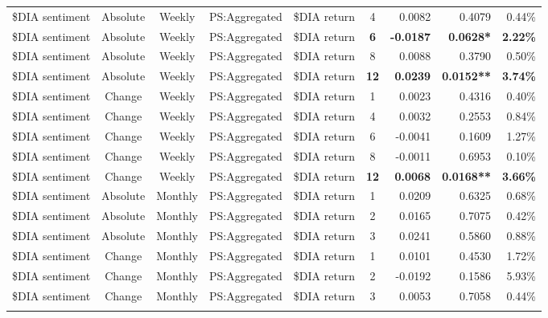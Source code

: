 \begin{longtable}{ccccccrrrrr}
    \$DIA sentiment & Absolute & Weekly & PS:Aggregated & \$DIA return & 4     & 0.0082 & \multicolumn{2}{r}{0.4079} & \multicolumn{2}{r}{0.44\%} \\
    \$DIA sentiment & Absolute & Weekly & PS:Aggregated & \$DIA return & \textbf{6} & \textbf{-0.0187} & \multicolumn{2}{r}{\textbf{0.0628*}} & \multicolumn{2}{r}{\textbf{2.22\%}} \\
    \$DIA sentiment & Absolute & Weekly & PS:Aggregated & \$DIA return & 8     & 0.0088 & \multicolumn{2}{r}{0.3790} & \multicolumn{2}{r}{0.50\%} \\
    \$DIA sentiment & Absolute & Weekly & PS:Aggregated & \$DIA return & \textbf{12} & \textbf{0.0239} & \multicolumn{2}{r}{\textbf{0.0152**}} & \multicolumn{2}{r}{\textbf{3.74\%}} \\
    \$DIA sentiment & Change & Weekly & PS:Aggregated & \$DIA return & 1     & 0.0023 & \multicolumn{2}{r}{0.4316} & \multicolumn{2}{r}{0.40\%} \\
    \$DIA sentiment & Change & Weekly & PS:Aggregated & \$DIA return & 4     & 0.0032 & \multicolumn{2}{r}{0.2553} & \multicolumn{2}{r}{0.84\%} \\
    \$DIA sentiment & Change & Weekly & PS:Aggregated & \$DIA return & 6     & -0.0041 & \multicolumn{2}{r}{0.1609} & \multicolumn{2}{r}{1.27\%} \\
    \$DIA sentiment & Change & Weekly & PS:Aggregated & \$DIA return & 8     & -0.0011 & \multicolumn{2}{r}{0.6953} & \multicolumn{2}{r}{0.10\%} \\
    \$DIA sentiment & Change & Weekly & PS:Aggregated & \$DIA return & \textbf{12} & \textbf{0.0068} & \multicolumn{2}{r}{\textbf{0.0168**}} & \multicolumn{2}{r}{\textbf{3.66\%}} \\
    \$DIA sentiment & Absolute & Monthly & PS:Aggregated & \$DIA return & 1     & 0.0209 & \multicolumn{2}{r}{0.6325} & \multicolumn{2}{r}{0.68\%} \\
    \$DIA sentiment & Absolute & Monthly & PS:Aggregated & \$DIA return & 2     & 0.0165 & \multicolumn{2}{r}{0.7075} & \multicolumn{2}{r}{0.42\%} \\
    \$DIA sentiment & Absolute & Monthly & PS:Aggregated & \$DIA return & 3     & 0.0241 & \multicolumn{2}{r}{0.5860} & \multicolumn{2}{r}{0.88\%} \\
    \$DIA sentiment & Change & Monthly & PS:Aggregated & \$DIA return & 1     & 0.0101 & \multicolumn{2}{r}{0.4530} & \multicolumn{2}{r}{1.72\%} \\
    \$DIA sentiment & Change & Monthly & PS:Aggregated & \$DIA return & 2     & -0.0192 & \multicolumn{2}{r}{0.1586} & \multicolumn{2}{r}{5.93\%} \\
    \$DIA sentiment & Change & Monthly & PS:Aggregated & \$DIA return & 3     & 0.0053 & \multicolumn{2}{r}{0.7058} & \multicolumn{2}{r}{0.44\%} \\
    
	\label{tab:appendix}%
    \end{longtable}%
 
  

